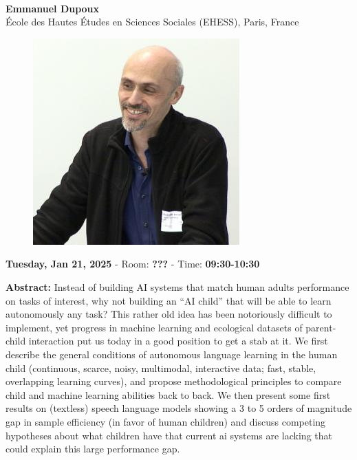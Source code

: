 \leavevmode\newline \leavevmode\newline
{\centering
{}\\  \vspace*{-0.1cm} \leavevmode\newline
{\normalsize \textbf{Emmanuel Dupoux}}\\
{\normalsize {École des Hautes Études en Sciences Sociales (EHESS), Paris, France}}\\


\begin{figure}[h!]
  \centering
      \includegraphics[width=0.15\linewidth]{examples/handbook_coling25/invited_talks/emmanuel_dupoux_invited_1.png}
\end{figure}

 {\normalsize \textbf{Tuesday, Jan 21, 2025} -
 Room: \textbf{???} -
 Time: \textbf{09:30-10:30}\\\leavevmode\newline
 }
}

{\textbf{Abstract:}}
Instead of building AI systems that match human adults performance on tasks of interest, why not building an “AI child” that will be able to learn autonomously any task? This rather old idea has been notoriously difficult to implement, yet progress in machine learning and ecological datasets of parent- child interaction put us today in a good position to get a stab at it. We first describe the general conditions of autonomous language learning in the human child (continuous, scarce, noisy, multimodal, interactive data; fast, stable, overlapping learning curves), and propose methodological principles to compare child and machine learning abilities back to back. We then present some first results on (textless) speech language models showing a 3 to 5 orders of magnitude gap in sample efficiency (in favor of human children) and discuss competing hypotheses about what children have that current ai systems are lacking that could explain this large performance gap.\\

